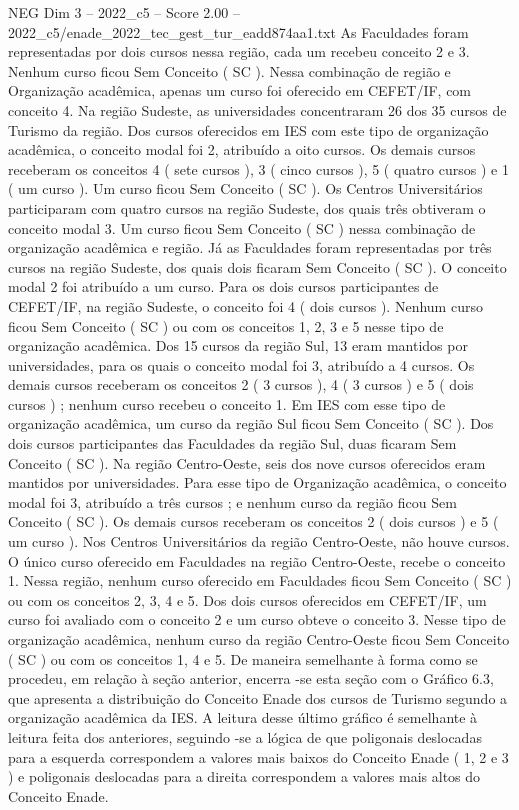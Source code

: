 \begin{textsample}{NEG Dim 3 – 2022\_c5 – Score 2.00 – 2022\_c5/enade\_2022\_tec\_gest\_tur\_eadd874aa1.txt}
As Faculdades foram representadas por dois cursos nessa região, cada um recebeu conceito 2 e 3.
Nenhum curso ficou Sem Conceito ( SC ).
Nessa combinação de região e Organização acadêmica, apenas um curso foi oferecido em CEFET/IF, com conceito 4.
Na região Sudeste, as universidades concentraram 26 dos 35 cursos de Turismo da região.
Dos cursos oferecidos em IES com este tipo de organização acadêmica, o conceito modal foi 2, atribuído a oito cursos.
Os demais cursos receberam os conceitos 4 ( sete cursos ), 3 ( cinco cursos ), 5 ( quatro cursos ) e 1 ( um curso ).
Um curso ficou Sem Conceito ( SC ).
Os Centros Universitários participaram com quatro cursos na região Sudeste, dos quais três obtiveram o conceito modal 3.
Um curso ficou Sem Conceito ( SC ) nessa combinação de organização acadêmica e região.
Já as Faculdades foram representadas por três cursos na região Sudeste, dos quais dois ficaram Sem Conceito ( SC ).
O conceito modal 2 foi atribuído a um curso.
Para os dois cursos participantes de CEFET/IF, na região Sudeste, o conceito foi 4 ( dois cursos ).
Nenhum curso ficou Sem Conceito ( SC ) ou com os conceitos 1, 2, 3 e 5 nesse tipo de organização acadêmica.
Dos 15 cursos da região Sul, 13 eram mantidos por universidades, para os quais o conceito modal foi 3, atribuído a 4 cursos.
Os demais cursos receberam os conceitos 2 ( 3 cursos ), 4 ( 3 cursos ) e 5 ( dois cursos ) ; nenhum curso recebeu o conceito 1.
Em IES com esse tipo de organização acadêmica, um curso da região Sul ficou Sem Conceito ( SC ).
Dos dois cursos participantes das Faculdades da região Sul, duas ficaram Sem Conceito ( SC ).
Na região Centro-Oeste, seis dos nove cursos oferecidos eram mantidos por universidades.
Para esse tipo de Organização acadêmica, o conceito modal foi 3, atribuído a três cursos ; e nenhum curso da região ficou Sem Conceito ( SC ).
Os demais cursos receberam os conceitos 2 ( dois cursos ) e 5 ( um curso ).
Nos Centros Universitários da região Centro-Oeste, não houve cursos.
O único curso oferecido em Faculdades na região Centro-Oeste, recebe o conceito 1.
Nessa região, nenhum curso oferecido em Faculdades ficou Sem Conceito ( SC ) ou com os conceitos 2, 3, 4 e 5.
Dos dois cursos oferecidos em CEFET/IF, um curso foi avaliado com o conceito 2 e um curso obteve o conceito 3.
Nesse tipo de organização acadêmica, nenhum curso da região Centro-Oeste ficou Sem Conceito ( SC ) ou com os conceitos 1, 4 e 5.
De maneira semelhante à forma como se procedeu, em relação à seção anterior, encerra -se esta seção com o Gráfico 6.3, que apresenta a distribuição do Conceito Enade dos cursos de Turismo segundo a organização acadêmica da IES.
A leitura desse último gráfico é semelhante à leitura feita dos anteriores, seguindo -se a lógica de que poligonais deslocadas para a esquerda correspondem a valores mais baixos do Conceito Enade ( 1, 2 e 3 ) e poligonais deslocadas para a direita correspondem a valores mais altos do Conceito Enade.

\end{textsample}
